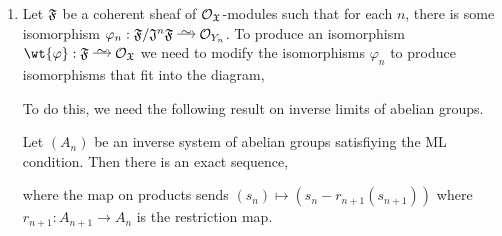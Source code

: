 \documentclass[12pt]{article}
\begin{document}
\begin{enumerate}
\item Let $\mathfrak{F}$ be a coherent sheaf of $\mathcal{O}_{\mathfrak{X}}$-modules such that for each $n$, there is some isomorphism $\varphi_n : \fF / \fJ^n \fF \iso \struct{Y_n}$. To produce an isomorphism $\wt{\varphi} : \fF \iso \struct{\fX}$ we need to modify the isomorphisms $\varphi_n$ to produce isomorphisms that fit into the diagram,
\begin{center}
\end{center}
To do this, we need the following result on inverse limits of abelian groups.

\begin{lemma}
Let $(A_n)$ be an inverse system of abelian groups satisfiying the ML condition. Then there is an exact sequence,
\begin{center}
\end{center}
where the map on products sends $(s_n) \mapsto (s_n - r_{n+1}(s_{n+1}))$ where $r_{n+1} : A_{n+1} \to A_n$ is the restriction map. 
\end{lemma}


\end{enumerate}
\end{document}
